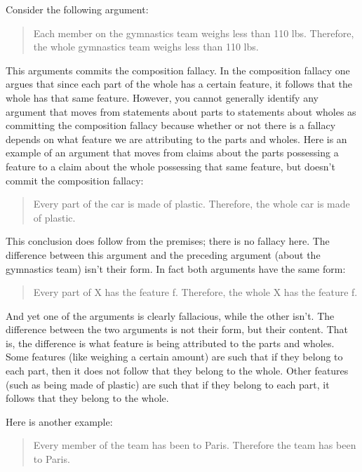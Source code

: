 Consider the following argument:

\begin{quote}      Each member on the gymnastics team weighs less than 110 lbs.
      Therefore, the whole gymnastics team weighs less than 110 lbs.\end{quote}

This arguments commits the composition fallacy. In the composition fallacy one
argues that since each part of the whole has a certain feature, it follows that the
whole has that same feature. However, you cannot generally identify any
argument that moves from statements about parts to statements about wholes
as committing the composition fallacy because whether or not there is a fallacy
depends on what feature we are attributing to the parts and wholes. Here is an
example of an argument that moves from claims about the parts possessing a
feature to a claim about the whole possessing that same feature, but doesn't
commit the composition fallacy:

\begin{quote}        Every part of the car is made of plastic. Therefore, the whole car is made
        of plastic. \end{quote}

This conclusion does follow from the premises; there is no fallacy here. The
difference between this argument and the preceding argument (about the
gymnastics team) isn't their form. In fact both arguments have the same form:
       
\begin{quote} Every part of X has the feature f. Therefore, the whole X has the feature f.\end{quote}

And yet one of the arguments is clearly fallacious, while the other isn't. The
difference between the two arguments is not their form, but their content. That
is, the difference is what feature is being attributed to the parts and wholes.
Some features (like weighing a certain amount) are such that if they belong to
each part, then it does not follow that they belong to the whole. Other features
(such as being made of plastic) are such that if they belong to each part, it
follows that they belong to the whole.

Here is another example:

\begin{quote}        Every member of the team has been to Paris. Therefore the team has
        been to Paris.\end{quote}

